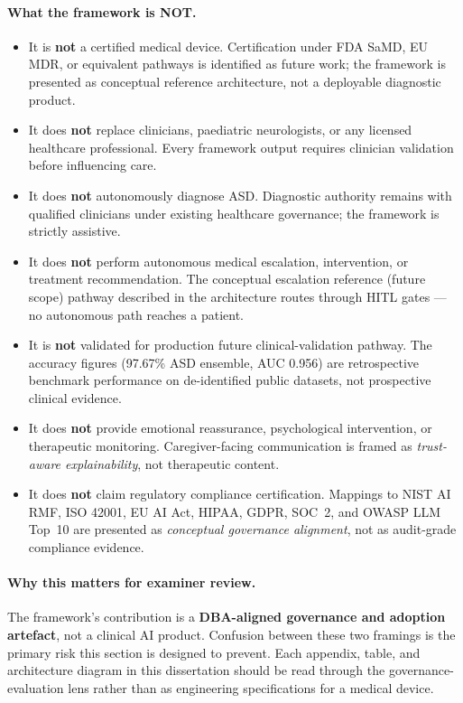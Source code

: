 \paragraph{What the framework is NOT.}
\begin{itemize}[leftmargin=*, itemsep=3pt]
    \item It is \textbf{not} a certified medical device. Certification under FDA SaMD, EU MDR, or equivalent pathways is identified as future work; the framework is presented as conceptual reference architecture, not a deployable diagnostic product.
    \item It does \textbf{not} replace clinicians, paediatric neurologists, or any licensed healthcare professional. Every framework output requires clinician validation before influencing care.
    \item It does \textbf{not} autonomously diagnose ASD. Diagnostic authority remains with qualified clinicians under existing healthcare governance; the framework is strictly assistive.
    \item It does \textbf{not} perform autonomous medical escalation, intervention, or treatment recommendation. The conceptual escalation reference (future scope) pathway described in the architecture routes through HITL gates --- no autonomous path reaches a patient.
    \item It is \textbf{not} validated for production future clinical-validation pathway. The accuracy figures (97.67\% ASD ensemble, AUC 0.956) are retrospective benchmark performance on de-identified public datasets, not prospective clinical evidence.
    \item It does \textbf{not} provide emotional reassurance, psychological intervention, or therapeutic monitoring. Caregiver-facing communication is framed as \emph{trust-aware explainability}, not therapeutic content.
    \item It does \textbf{not} claim regulatory compliance certification. Mappings to NIST AI RMF, ISO 42001, EU AI Act, HIPAA, GDPR, SOC~2, and OWASP LLM Top~10 are presented as \emph{conceptual governance alignment}, not as audit-grade compliance evidence.
\end{itemize}

\paragraph{Why this matters for examiner review.} The framework's contribution is a \textbf{DBA-aligned governance and adoption artefact}, not a clinical AI product. Confusion between these two framings is the primary risk this section is designed to prevent. Each appendix, table, and architecture diagram in this dissertation should be read through the governance-evaluation lens rather than as engineering specifications for a medical device.

